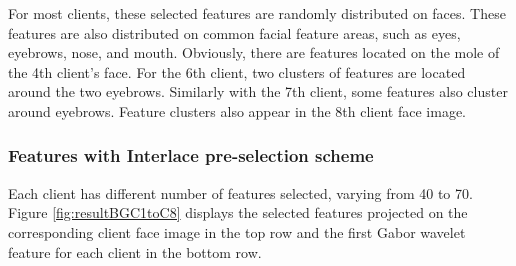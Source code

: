 For most clients, these selected features are randomly distributed on faces. These features are also distributed on common facial feature areas, such as eyes, eyebrows, nose, and mouth. Obviously, there are features located on the mole of the 4th client's face. For the 6th client, two clusters of features are located around the two eyebrows. Similarly with the 7th client, some features also cluster around eyebrows. Feature clusters also appear in the 8th client face image.

\subsubsection{Features with Interlace pre-selection scheme}
Each client has different number of features selected, varying from 40 to 70. \mbox{Figure} \ref{fig:resultBGC1toC8} displays the selected features projected on the corresponding client face image in the top row and the first Gabor wavelet feature for each client in the bottom row.
